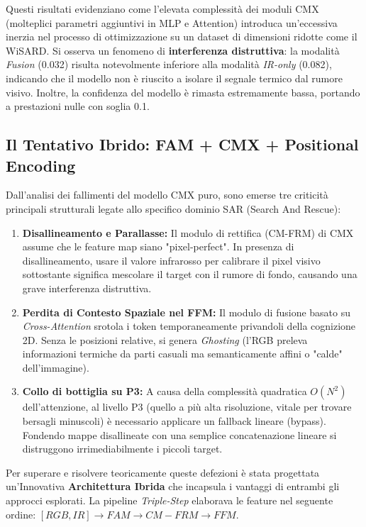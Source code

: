 \documentclass[a4paper,11pt]{article}
\begin{document}
Questi risultati evidenziano come l'elevata complessità dei moduli CMX (molteplici parametri aggiuntivi in MLP e Attention) introduca un'eccessiva inerzia nel processo di ottimizzazione su un dataset di dimensioni ridotte come il WiSARD. Si osserva un fenomeno di \textbf{interferenza distruttiva}: la modalità \emph{Fusion} (0.032) risulta notevolmente inferiore alla modalità \emph{IR-only} (0.082), indicando che il modello non è riuscito a isolare il segnale termico dal rumore visivo. Inoltre, la confidenza del modello è rimasta estremamente bassa, portando a prestazioni nulle con soglia 0.1.

\subsection*{Il Tentativo Ibrido: FAM + CMX + Positional Encoding}

Dall'analisi dei fallimenti del modello CMX puro, sono emerse tre criticità principali strutturali legate allo specifico dominio SAR (Search And Rescue):
\begin{enumerate}
    \item \textbf{Disallineamento e Parallasse:} Il modulo di rettifica (CM-FRM) di CMX assume che le feature map siano "pixel-perfect". In presenza di disallineamento, usare il valore infrarosso per calibrare il pixel visivo sottostante significa mescolare il target con il rumore di fondo, causando una grave interferenza distruttiva.
    \item \textbf{Perdita di Contesto Spaziale nel FFM:} Il modulo di fusione basato su \textit{Cross-Attention} srotola i token temporaneamente privandoli della cognizione 2D. Senza le posizioni relative, si genera \textit{Ghosting} (l'RGB preleva informazioni termiche da parti casuali ma semanticamente affini o "calde" dell'immagine).
    \item \textbf{Collo di bottiglia su P3:} A causa della complessità quadratica $O(N^2)$ dell'attenzione, al livello P3 (quello a più alta risoluzione, vitale per trovare bersagli minuscoli) è necessario applicare un fallback lineare (bypass). Fondendo mappe disallineate con una semplice concatenazione lineare si distruggono irrimediabilmente i piccoli target.
\end{enumerate}

Per superare  e risolvere teoricamente queste defezioni è stata progettata un'Innovativa \textbf{Architettura Ibrida} che incapsula i vantaggi di entrambi gli approcci esplorati. La pipeline \textit{Triple-Step} elaborava le feature nel seguente ordine: $[RGB, IR] \rightarrow FAM \rightarrow CM-FRM \rightarrow FFM$. 
\end{document}
